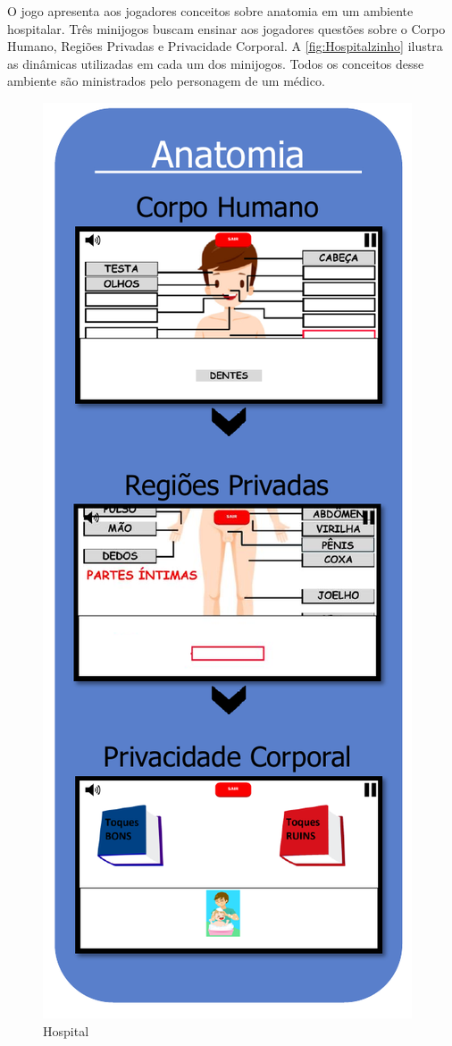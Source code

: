 \newpage

O jogo apresenta aos jogadores conceitos sobre anatomia em um ambiente hospitalar. Três minijogos buscam ensinar aos jogadores questões sobre o Corpo Humano, Regiões Privadas e Privacidade Corporal. A \autoref{fig:Hospitalzinho} ilustra as dinâmicas utilizadas em cada um dos minijogos. Todos os conceitos desse ambiente são ministrados pelo personagem de um médico. 


\begin{figure}%
  \vspace{-20pt}
  \caption{\label{fig:Hospitalzinho}Hospital}
  \includegraphics[width=\linewidth]{./Figuras/Hospital.pdf}

\end{figure}
